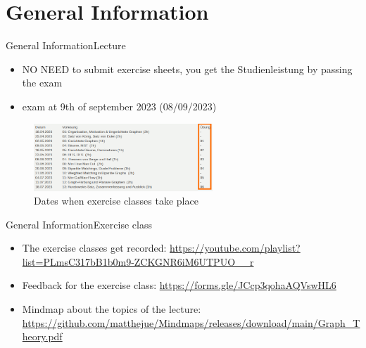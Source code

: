 
\section{General Information}

\begin{frame}{General Information}{Lecture}
  \begin{itemize}
    \item {\large \uppercase{\alert{no need}}} to submit exercise sheets, you get the \alert{Studienleistung} by \alert{passing the exam}
    \item \alert{exam} at 9th of september 2023 (08/09/2023)
  \end{itemize}
  \begin{figure}
    \includegraphics[width=0.6\textwidth]{./figures/dates.png}
    \caption{Dates when exercise classes take place}
  \end{figure}
\end{frame}

\begin{frame}{General Information}{Exercise class}
  \begin{itemize}
    \item The exercise classes get \alert{recorded}: \url{https://youtube.com/playlist?list=PLmsC317bB1b0m9-ZCKGNR6iM6UTPUO__r}
    \item \alert{Feedback} for the exercise class: \url{https://forms.gle/JCcp3qohaAQVswHL6}
    \item \alert{Mindmap} about the topics of the lecture: \url{https://github.com/matthejue/Mindmaps/releases/download/main/Graph_Theory.pdf}
  \end{itemize}
\end{frame}
